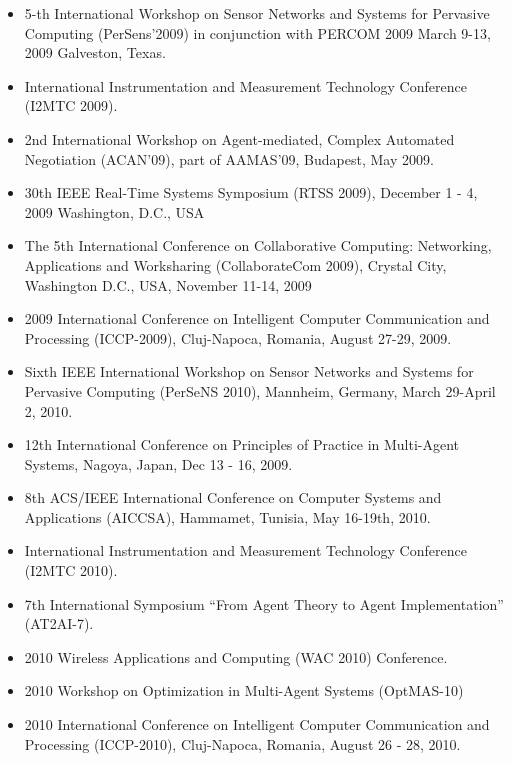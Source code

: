\begin{itemize}
\item 5-th International Workshop
on Sensor Networks and Systems for Pervasive Computing (PerSens'2009)
in conjunction with PERCOM 2009 March 9-13, 2009 Galveston, Texas.

\item International Instrumentation and
Measurement Technology Conference (I2MTC 2009).

\item 2nd International Workshop on Agent-mediated, Complex Automated Negotiation (ACAN'09), part of AAMAS'09, Budapest, May 2009.

\item 30th IEEE Real-Time Systems Symposium (RTSS 2009), December 1 - 4, 2009 Washington, D.C., USA

\item The 5th International Conference on Collaborative Computing:
Networking, Applications and Worksharing (CollaborateCom 2009),
Crystal City, Washington D.C., USA, November 11-14, 2009

\item 2009 International Conference on Intelligent
Computer Communication and Processing (ICCP-2009), Cluj-Napoca, Romania,
August 27-29, 2009.

\item Sixth IEEE International Workshop
on Sensor Networks and Systems for Pervasive Computing (PerSeNS 2010), Mannheim,
Germany, March 29-April 2, 2010.

\item 12th International Conference on Principles of Practice in Multi-Agent Systems, Nagoya, Japan, Dec 13 - 16, 2009.

\item 8th ACS/IEEE International Conference on Computer Systems and Applications (AICCSA), Hammamet, Tunisia, May 16-19th, 2010.

\item International Instrumentation and
Measurement Technology Conference (I2MTC 2010).

\item 7th International
Symposium ``From Agent Theory to Agent Implementation'' (AT2AI-7).

\item 2010 Wireless Applications and
Computing (WAC 2010) Conference.

\item 2010 Workshop on Optimization in Multi-Agent Systems (OptMAS-10)

\item 2010 International Conference on Intelligent
Computer Communication and Processing (ICCP-2010), Cluj-Napoca, Romania, August 26 - 28, 2010.


\end{itemize}
